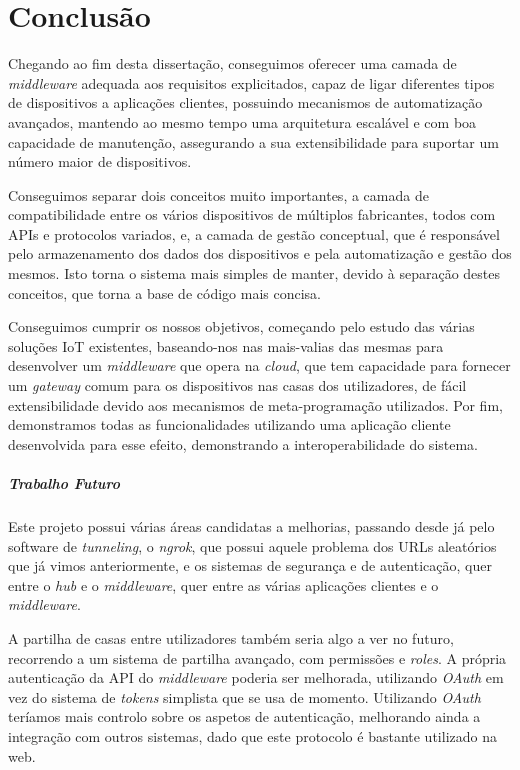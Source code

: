 \chapter{Conclusão}

Chegando ao fim desta dissertação, conseguimos oferecer uma camada de \textit{middleware} adequada aos requisitos explicitados, capaz de ligar diferentes tipos de dispositivos a aplicações clientes, possuindo mecanismos de automatização avançados, mantendo ao mesmo tempo uma arquitetura escalável e com boa capacidade de manutenção, assegurando a sua extensibilidade para suportar um número maior de dispositivos.

Conseguimos separar dois conceitos muito importantes, a camada de compatibilidade entre os vários dispositivos de múltiplos fabricantes, todos com APIs e protocolos variados, e, a camada de gestão conceptual, que é responsável pelo armazenamento dos dados dos dispositivos e pela automatização e gestão dos mesmos. Isto torna o sistema mais simples de manter, devido à separação destes conceitos, que torna a base de código mais concisa.

Conseguimos cumprir os nossos objetivos, começando pelo estudo das várias soluções IoT existentes, baseando-nos nas mais-valias das mesmas para desenvolver um \textit{middleware} que opera na \textit{cloud}, que tem capacidade para fornecer um \textit{gateway} comum para os dispositivos nas casas dos utilizadores, de fácil extensibilidade devido aos mecanismos de meta-programação utilizados. Por fim, demonstramos todas as funcionalidades utilizando uma aplicação cliente desenvolvida para esse efeito, demonstrando a interoperabilidade do sistema.

\paragraph*{Trabalho Futuro}

Este projeto possui várias áreas candidatas a melhorias, passando desde já pelo software de \textit{tunneling}, o \textit{ngrok}, que possui aquele problema dos URLs aleatórios que já vimos anteriormente, e os sistemas de segurança e de autenticação, quer entre o \textit{hub} e o \textit{middleware}, quer entre as várias aplicações clientes e o \textit{middleware}. 

A partilha de casas entre utilizadores também seria algo a ver no futuro, recorrendo a um sistema de partilha avançado, com permissões e \textit{roles}. A própria autenticação da API do \textit{middleware} poderia ser melhorada, utilizando \textit{OAuth} em vez do sistema de \textit{tokens} simplista que se usa de momento. Utilizando \textit{OAuth} teríamos mais controlo sobre os aspetos de autenticação, melhorando ainda a integração com outros sistemas, dado que este protocolo é bastante utilizado na web.

